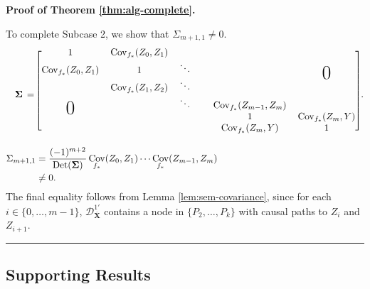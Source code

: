 \documentclass[11pt]{article}
\newcommand\bigzero{\makebox(0,0){\text{\huge0}}}
\DeclareMathOperator{\Cov}{Cov}
\DeclareMathOperator{\Det}{Det}
\newcommand{\BlackBox}{\rule{1.5ex}{1.5ex}}  %
\newcommand{\mb}[1]{\mathbf{#1}}
\newcommand{\g}[1][G]{\mathcal{#1}}
\newenvironment{proofofnoqed}[1][]{\noindent \textbf{Proof of #1.}}{}
\begin{document}
\begin{proofofnoqed}[Theorem \ref{thm:alg-complete}]
\begin{itemize}
        To complete Subcase 2, we show that $\Sigma_{m+1,1} \neq 0$.        
        \begin{align*}
        \mb{\Sigma} \,=\, &
        \begin{blockarray}{cccccc}
        \begin{block}{[cccccc]}
            1   			       & \Cov_{f_*}(Z_0,Z_1) & & & & \\
      	    \Cov_{f_*}(Z_0,Z_1) & 1                      & \ddots & & & \bigzero \\
                                   & \Cov_{f_*}(Z_1,Z_2) & \ddots & & &	& \\
           	\bigzero               &                        & \ddots & & \Cov_{f_*}(Z_{m-1}, Z_m) 	& & \\
                                   & & & & 1                     & \Cov_{f_*}(Z_m, Y) \\
                                   & & & & \Cov_{f_*}(Z_m, Y) & 1 \\
        \end{block}
        \end{blockarray}.\\
        \Sigma_{m+1,1} &= \frac{(-1)^{m+2}}{\Det(\mb{\Sigma})} \Cov_{f_*}(Z_0,Z_1) \cdots \Cov_{f_*}(Z_{m-1},Z_m) \\
        &\neq 0.
        \end{align*}
        The final equality follows from Lemma \ref{lem:sem-covariance}, since for each $i \in \{0, \dots, m-1\}$, $\g[D]^{1'}_{\overline{\mb{X}}}$ contains a node in $\{P_2, \dots, P_k\}$ with causal paths to $Z_i$ and $Z_{i+1}$.
    \hfill \BlackBox
    \end{itemize}
\end{proofofnoqed}











\subsection{Supporting Results}


\end{document}
